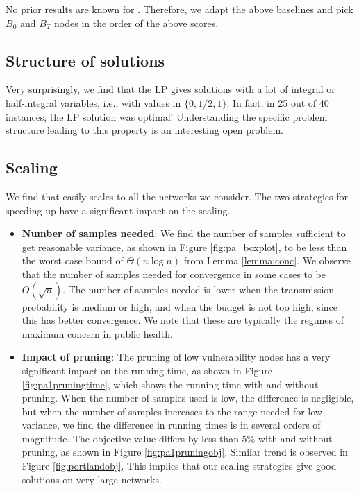 No prior results are known for \probtwo{}. Therefore, we adapt the above baselines and pick $B_0$ and $B_T$
nodes in the order of the above scores.

\subsection{Structure of solutions}

Very surprisingly, we find that the LP gives solutions with a lot of integral or half-integral variables, i.e., with values in $\{0, 1/2, 1\}$. 
In fact, in 25 out of 40 instances, the LP solution was optimal! Understanding the specific problem structure leading to this property is an interesting open problem.

  

\subsection{Scaling}

We find that \algo{} easily scales to all the networks we consider. The two strategies for speeding up have a
significant impact on the scaling.
\begin{itemize}[leftmargin=0.1in, noitemsep, topsep=0pt]
\item
\textbf{Number of samples needed}: We find the number of samples  sufficient to get reasonable variance, as shown in Figure \ref{fig:pa_boxplot},
to be less than the worst case bound of $\Theta(n\log{n})$ from Lemma \ref{lemma:conc}. We observe that the number of samples needed for convergence in some cases to be $O(\sqrt{n})$.
The number of samples needed is lower when the transmission probability is medium or high, and when the budget is not too high,
since this has better convergence. We note that these are typically the regimes of maximum concern in public health.
\item
\textbf{Impact of pruning}: The pruning of low vulnerability nodes has a very significant impact on the running time,
as shown in Figure \ref{fig:pa1pruningtime}, which shows the running time with and without pruning. 
When the number of samples used is low, the difference is negligible, but when the number of samples increases to
the range needed for low variance, we find the difference in running times is in several orders of magnitude.
The objective value differs by less than $5\%$ with and without pruning, as shown in Figure \ref{fig:pa1pruningobj}. Similar trend is observed in Figure \ref{fig:portlandobj}.
This implies that our scaling strategies give good solutions on very large networks.
\end{itemize}
 
